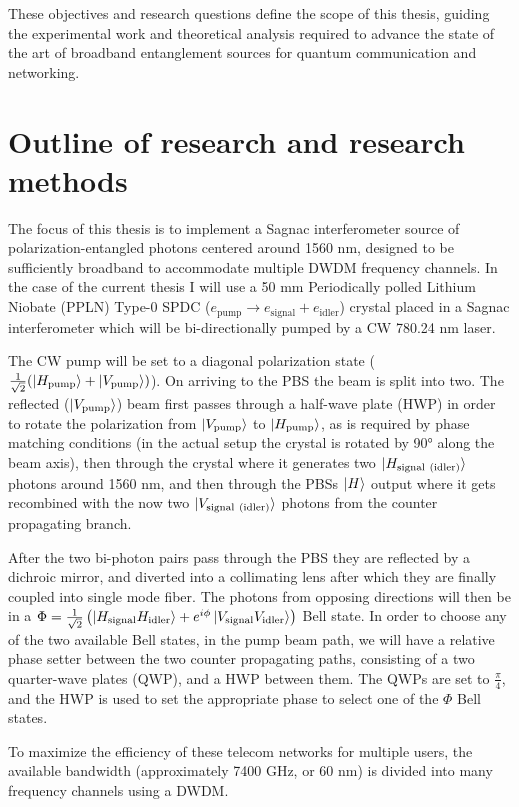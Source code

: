 \documentclass{article}
\theoremstyle{mytheoremstyle}
\theoremstyle{mytheoremstyle}
\theoremstyle{myproblemstyle}
\begin{document}
\par These objectives and research questions define the scope of this thesis,
guiding the experimental work and theoretical analysis required to advance the state of the art
of broadband entanglement sources for quantum communication and networking.
\section{Outline of research and research methods}
The focus of this thesis is to implement a Sagnac interferometer source of polarization-entangled photons centered around 1560 nm,
designed to be sufficiently broadband to accommodate multiple DWDM frequency channels.
In the case of the current thesis I will use a 50 mm Periodically polled Lithium Niobate (PPLN)
Type-0 SPDC ($e_{\mathrm{pump}} \rightarrow e_{\mathrm{signal}} + e_{\mathrm{idler}}$) crystal placed in a Sagnac interferometer
which will be bi-directionally pumped by a CW 780.24 nm laser.
\par The CW pump will be set to a diagonal polarization state ($\frac{1}{\sqrt{2}}(\ket{H_{\mathrm{pump}}} + \ket{V_{\mathrm{pump}}})$). On arriving to the
PBS the beam is split into two. The reflected ($\ket{V_{\mathrm{pump}}}$) beam first passes through a half-wave plate (HWP) in order to rotate the
polarization from $\ket{V_{\mathrm{pump}}}$ to $\ket{H_{\mathrm{pump}}}$, as is required by phase matching conditions (in the actual setup the crystal is rotated by 90° along the beam axis), then through
the crystal where it generates two $\ket{H_{\mathrm{signal}\ (\mathrm{idler})}}$ photons around 1560 nm, and then through the PBSs $\ket{H}$ output where it gets recombined
with the now two $\ket{V_{\mathrm{signal}\ (\mathrm{idler})}}$ photons from the counter propagating branch.

After the two bi-photon pairs pass through the PBS they are reflected by a dichroic mirror, and diverted into a collimating lens
after which they are finally coupled into single mode fiber. The photons from opposing directions will then be in a
$\Phi = \frac{1}{\sqrt{2}}\left( \ket{H_{\mathrm{signal}}H_{\mathrm{idler}}} + e^{i \phi}\ket{V_{\mathrm{signal}}V_{\mathrm{idler}}}\right)$ Bell state.
In order to choose any of the two available Bell states, in the pump beam path, we will have
a relative phase setter between the two counter propagating paths, consisting of a two quarter-wave plates (QWP), and a HWP between them.
The QWPs are set to $\frac{\pi}{4}$, and the HWP is used to set the appropriate phase to select one of the $\Phi$ Bell states.
\par To maximize the efficiency of these telecom networks for multiple users, the available bandwidth (approximately 7400 GHz, or 60 nm)
is divided into many frequency channels using a DWDM.
\end{document}
